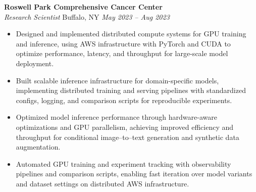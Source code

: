 \vspace*{-1pt}
\item \textbf{Roswell Park Comprehensive Cancer Center}\\
\textit{Research Scientist} \hfill Buffalo, NY \quad \textit{May 2023 -- Aug 2023}
\vspace*{-3pt}
\begin{itemize}[leftmargin=0.2in, topsep=1pt]
  \item Designed and implemented distributed compute systems for GPU training and inference, using AWS infrastructure with PyTorch and CUDA to optimize performance, latency, and throughput for large-scale model deployment.
  \item Built scalable inference infrastructure for domain-specific models, implementing distributed training and serving pipelines with standardized configs, logging, and comparison scripts for reproducible experiments.
  \item Optimized model inference performance through hardware-aware optimizations and GPU parallelism, achieving improved efficiency and throughput for conditional image–to–text generation and synthetic data augmentation.
  \item Automated GPU training and experiment tracking with observability pipelines and comparison scripts, enabling fast iteration over model variants and dataset settings on distributed AWS infrastructure.
\end{itemize}
